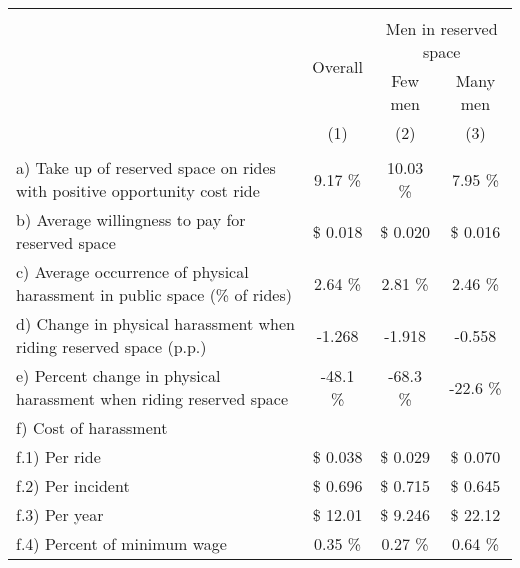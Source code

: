 \begin{tabular}{lccc}
       \hline\hline  \\[-1.8ex] 
       & \multirow{2}{*}{Overall} & \multicolumn{2}{c}{Men in reserved space} \\
       &  & Few men  & Many men \\
       & (1) & (2) & (3) \\
       \hline   \\[-1.8ex]
       a) Take up of reserved space on rides with positive opportunity cost ride  &         9.17 \% &       10.03 \% &        7.95 \% \\
       b) Average willingness to pay for reserved space                                                   & \$   0.018    & \$   0.020    & \$   0.016    \\
       c) Average occurrence of physical harassment in public space (\% of rides) &        2.64 \% &        2.81 \% &        2.46 \% \\
       d) Change in physical harassment when riding reserved space (p.p.)                 &      -1.268    &      -1.918    &      -0.558    \\
       e) Percent change in physical harassment when riding reserved space        &       -48.1 \% &       -68.3 \% &       -22.6 \% \\
       \multicolumn{5}{l}{f) Cost of harassment} \\
       f.1) Per ride                                                                                                                      & \$   0.038    & \$   0.029    & \$   0.070    \\
       f.2) Per incident                                                                                                                  & \$   0.696    & \$   0.715    & \$   0.645    \\
       f.3) Per year                                                                                                                      & \$   12.01    & \$   9.246    & \$   22.12    \\
       f.4) Percent of minimum wage                                                                                       &        0.35 \% &        0.27 \% &        0.64 \% \\
       \hline \hline
\end{tabular}
